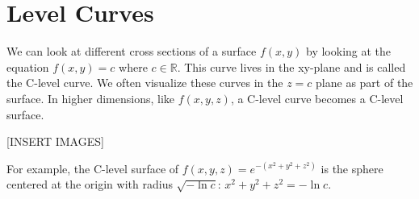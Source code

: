 \section{Level Curves}
\noindent
We can look at different cross sections of a surface $f(x,y)$ by looking at the equation $f(x,y)=c$ where $c\in\mathbb{R}$. This curve lives in the xy-plane and is called the C-level curve. We often visualize these curves in the $z=c$ plane as part of the surface. In higher dimensions, like $f(x,y,z)$, a C-level curve becomes a C-level surface.

[INSERT IMAGES]

\noindent
For example, the C-level surface of $f(x,y,z)=e^{-\left(x^2+y^2+z^2\right)}$ is the sphere centered at the origin with radius $\sqrt{-\ln{c}}$: $x^2+y^2+z^2=-\ln{c}$.